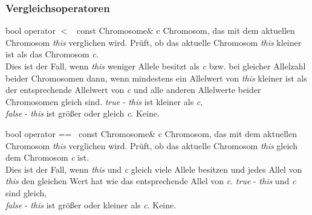 \documentclass{report}
\begin{document}
\newpage
\subsubsection{Vergleichsoperatoren}

    \setConstInstance
    \printMethodWithOneParam
        {bool}  
        {operator $<$\ } 
        {const Chromosome\&}
        {c} 
        {Chromosom, das mit dem aktuellen Chromosom {\em this}
         verglichen wird.}
        {Pr\"uft, ob das aktuelle Chromosom {\em this}
         kleiner ist als das Chromosom {\em c}.\\
         Dies ist der Fall, wenn {\em this} weniger Allele
         besitzt als {\em c} bzw. bei gleicher Allelzahl beider Chromosomen
         dann, wenn mindestens ein Allelwert von {\em this} kleiner ist
         als der entsprechende Allelwert von {\em c} und alle anderen
         Allelwerte beider Chromosomen gleich sind.}
        {
         {\em true}\hspace{2pt} - {\em this} ist kleiner als {\em c},\\
         {\em false} - {\em this} ist gr\"o{\ss}er oder gleich {\em c}.}
        {Keine.}

\vspace{4ex}

    \setConstInstance
    \printMethodWithOneParam
        {bool}  
        {operator ==\ } 
        {const Chromosome\&}
        {c} 
        {Chromosom, das mit dem aktuellen Chromosom {\em this}
         verglichen wird.}
        {Pr\"uft, ob das aktuelle Chromosom {\em this}
         gleich dem Chromosom {\em c} ist.\\
         Dies ist der Fall, wenn {\em this} und {\em c} gleich viele Allele
         besitzen und jedes Allel von {\em this} den gleichen Wert hat
         wie das entsprechende Allel von {\em c}.}
        {
         {\em true}\hspace{2pt} - {\em this} und {\em c} sind gleich,\\
         {\em false} - {\em this} ist gr\"o{\ss}er oder kleiner als {\em c}.}
        {Keine.}

\newpage
\end{document}
